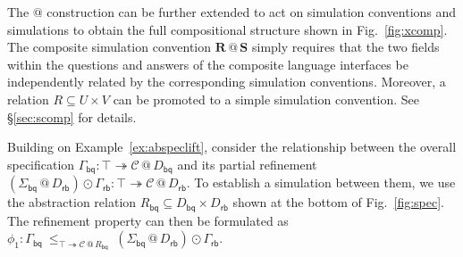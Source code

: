 \documentclass[acmsmall,screen,review,anonymous]{acmart}
\newcommand{\kw}[1]{\ensuremath{ \mathsf{#1} }}
\newcommand{\vcomp}{\fatsemi}
\begin{document}
The $\mathbin@$ construction can be further extended
to act on simulation conventions and simulations
to obtain the full compositional structure shown in Fig.~\ref{fig:xcomp}.
The composite simulation convention $\mathbf{R} \mathbin@ \mathbf{S}$
simply requires that the two fields within the questions and answers
of the composite language interfaces
be independently related by the corresponding simulation conventions.
Moreover, a relation $R \subseteq U \times V$
can be promoted to a simple simulation convention.
See \S\ref{sec:scomp} for details.


\begin{example} \label{ex:bqcorrect} %
Building on Example~\ref{ex:abspeclift},
consider the relationship between
the overall specification $
  \Gamma_\kw{bq} :
    \top \twoheadrightarrow \mathcal{C} \mathbin@ D_\kw{bq}
$
and its partial refinement
$
  (\Sigma_\kw{bq} \mathbin@ D_\kw{rb}) \odot \Gamma_\kw{rb} :
    \top \twoheadrightarrow \mathcal{C} \mathbin@ D_\kw{rb}
$.
To establish a simulation between them,
we use the abstraction relation
$R_\kw{bq} \subseteq D_\kw{bq} \times D_\kw{rb}$
shown at the bottom of Fig.~\ref{fig:spec}.
The refinement property can then be formulated as
$
  \phi_1 :
  \Gamma_\kw{bq}
  \:\le_{\top \twoheadrightarrow \mathcal{C} \mathbin@ R_\kw{bq}}\:
  (\Sigma_\kw{bq} \mathbin@ D_\kw{rb}) \odot
  \Gamma_\kw{rb}
$.
\end{example}


\end{document}
